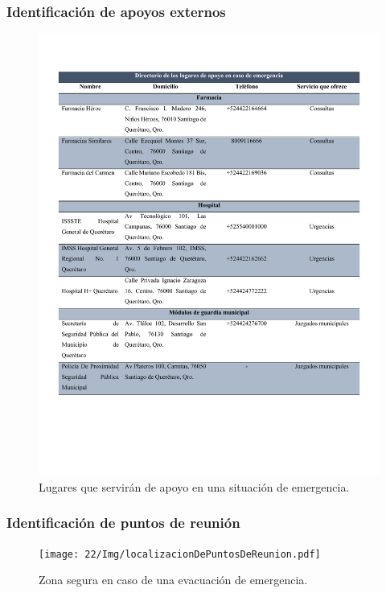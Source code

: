     \subsubsection{Identificación de apoyos externos}
    \begin{figure}[H]
        \centering
        \includegraphics[trim = {10mm 45mm 10mm 15mm},clip,scale=0.4]{22/Img/apoyosExt.pdf}
        \caption{ Lugares que servirán de apoyo en una situación de emergencia.}
        \label{fig:apoyosExt}
    \end{figure}
    
    \subsubsection{Identificación de puntos de reunión}
    
    
    \begin{figure}[H]
        \centering
         \texttt{[image: 22/Img/localizacionDePuntosDeReunion.pdf]}
        \caption{Zona segura en caso de una evacuación de emergencia.}
        \label{fig:puntosDeReunión}
    \end{figure}
    
